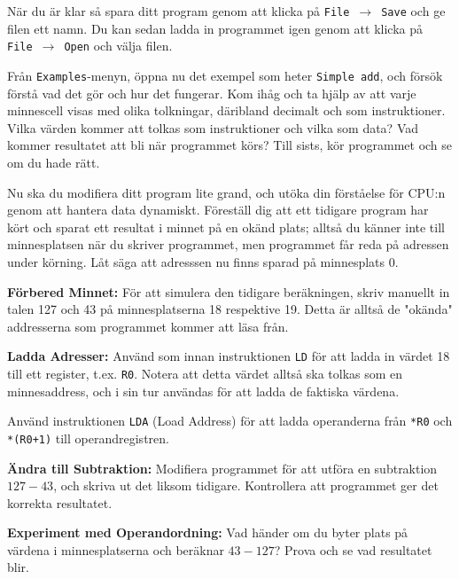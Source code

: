 \begin{Datorarbete}
    När du är klar så spara ditt program genom att klicka på \texttt{File}~$\rightarrow$~\texttt{Save} och ge filen ett namn. Du kan sedan ladda in programmet igen genom att klicka på \texttt{File}~$\rightarrow$~\texttt{Open} och välja filen.
    \vspace{-2mm}

    \item {} Från \texttt{Examples}-menyn, öppna nu det exempel som heter \texttt{Simple~add}, och försök förstå vad det gör och hur det fungerar. Kom ihåg och ta hjälp av att varje minnescell visas med olika tolkningar, däribland decimalt och som instruktioner. Vilka värden kommer att tolkas som instruktioner och vilka som data? Vad kommer resultatet att bli när programmet körs? Till sists, kör programmet och se om du hade rätt.
    
    \item {} Nu ska du modifiera ditt program lite grand, och utöka din förståelse för CPU:n genom att hantera data dynamiskt. Föreställ dig att ett tidigare program har kört och sparat ett resultat i minnet på en okänd plats; alltså du känner inte till minnesplatsen när du skriver programmet, men programmet får reda på adressen under körning. Låt säga att adresssen nu finns sparad på minnesplats 0.

    \begin{Deluppgifter}
        \item \textbf{Förbered Minnet:} För att simulera den tidigare beräkningen, skriv manuellt in talen 127 och 43 på minnesplatserna 18 respektive 19. Detta är alltså de "okända" addresserna som programmet kommer att läsa från.
        \item \textbf{Ladda Adresser:} Använd som innan instruktionen \texttt{LD} för att ladda in värdet 18 till ett register, t.ex. \texttt{R0}. Notera att detta värdet alltså ska tolkas som en minnesaddress, och i sin tur användas för att ladda de faktiska värdena.
        \item Använd instruktionen \texttt{LDA} (Load Address) för att ladda operanderna från \texttt{*R0} och \texttt{*(R0+1)} till operandregistren.
        \item \textbf{Ändra till Subtraktion:} Modifiera programmet för att utföra en subtraktion \(127-43\), och skriva ut det liksom tidigare. Kontrollera att programmet ger det korrekta resultatet.
        \item \textbf{Experiment med Operandordning:} Vad händer om du byter plats på värdena i minnesplatserna och beräknar \(43-127\)? Prova och se vad resultatet blir.
    \end{Deluppgifter}


\end{Datorarbete}
